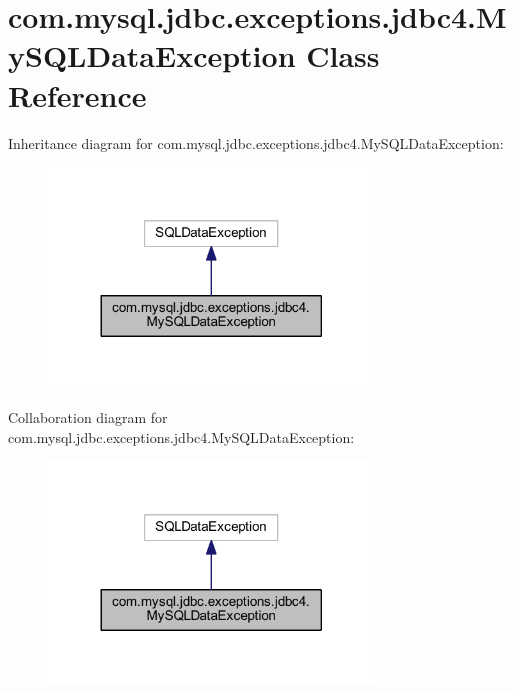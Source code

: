 \hypertarget{classcom_1_1mysql_1_1jdbc_1_1exceptions_1_1jdbc4_1_1_my_s_q_l_data_exception}{}\section{com.\+mysql.\+jdbc.\+exceptions.\+jdbc4.\+My\+S\+Q\+L\+Data\+Exception Class Reference}
\label{classcom_1_1mysql_1_1jdbc_1_1exceptions_1_1jdbc4_1_1_my_s_q_l_data_exception}


Inheritance diagram for com.\+mysql.\+jdbc.\+exceptions.\+jdbc4.\+My\+S\+Q\+L\+Data\+Exception\+:
\nopagebreak
\begin{figure}[H]
\begin{center}
\leavevmode
\includegraphics[width=245pt]{classcom_1_1mysql_1_1jdbc_1_1exceptions_1_1jdbc4_1_1_my_s_q_l_data_exception__inherit__graph}
\end{center}
\end{figure}


Collaboration diagram for com.\+mysql.\+jdbc.\+exceptions.\+jdbc4.\+My\+S\+Q\+L\+Data\+Exception\+:
\nopagebreak
\begin{figure}[H]
\begin{center}
\leavevmode
\includegraphics[width=245pt]{classcom_1_1mysql_1_1jdbc_1_1exceptions_1_1jdbc4_1_1_my_s_q_l_data_exception__coll__graph}
\end{center}
\end{figure}
